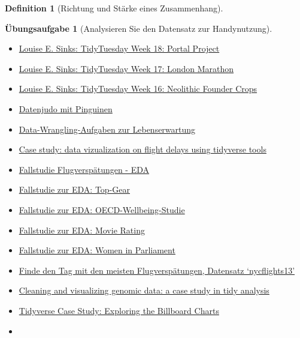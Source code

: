 \documentclass[
  a4paper,
  DIV=11]{scrreprt}
\theoremstyle{definition}
\newtheorem{exercise}{Übungsaufgabe}[chapter]
\theoremstyle{definition}
\theoremstyle{definition}
\newtheorem{definition}{Definition}[chapter]
\theoremstyle{remark}
\begin{document}
\begin{definition}[Richtung und Stärke eines
Zusammenhang]
\begin{exercise}[Analysieren Sie den Datensatz zur
Handynutzung]
\begin{itemize}
\item
  \href{https://lsinks.github.io/posts/2023-05-02-portal-project/portal.html}{Louise
  E. Sinks: TidyTuesday Week 18: Portal Project}
\item
  \href{https://lsinks.github.io/posts/2023-04-25-tidytuesday-marathon/marathon.html}{Louise
  E. Sinks: TidyTuesday Week 17: London Marathon}
\item
  \href{https://lsinks.github.io/posts/2023-04-18-tidytuesday-founder-crops/founder-crops.html}{Louise
  E. Sinks: TidyTuesday Week 16: Neolithic Founder Crops}
\item
  \href{https://allisonhorst.shinyapps.io/dplyr-learnr/\#section-welcome}{Datenjudo
  mit Pinguinen}
\item
  \href{https://data-se.netlify.app/2021/02/24/exercises-to-data-wrangling-with-the-tidyverse/}{Data-Wrangling-Aufgaben
  zur Lebenserwartung}
\item
  \href{https://data-se.netlify.app/2021/02/24/case-study-data-vizualization-on-flight-delays-using-tidyverse-tools/}{Case
  study: data vizualization on flight delays using tidyverse tools}
\item
  \href{https://data-se.netlify.app/2021/03/08/eda-zu-flugversp\%C3\%A4tungen/}{Fallstudie
  Flugverspätungen - EDA}
\item
  \href{https://data-se.netlify.app/2021/02/11/yacda-topgear/}{Fallstudie
  zur EDA: Top-Gear}
\item
  \href{https://data-se.netlify.app/2021/02/11/explorative-datenanalyse-zum-datensatz-oecd-wellbeing/}{Fallstudie
  zur EDA: OECD-Wellbeing-Studie}
\item
  \href{https://minimaxir.com/2018/07/imdb-data-analysis/}{Fallstudie
  zur EDA: Movie Rating}
\item
  \href{https://github.com/saghirb/WiP-tidyverse/blob/master/doc/WiP-tidyverse.pdf}{Fallstudie
  zur EDA: Women in Parliament}
\item
  \href{https://data-se.netlify.app/2021/05/27/datensatz-flights-finde-den-tag-mit-den-meisten-abfl\%C3\%BCgen/}{Finde
  den Tag mit den meisten Flugverspätungen, Datensatz `nycflights13'}
\item
  \href{http://varianceexplained.org/r/tidy-genomics/}{Cleaning and
  visualizing genomic data: a case study in tidy analysis}
\item
  \href{https://www.njtierney.com/post/2017/11/07/tidyverse-billboard/}{Tidyverse
  Case Study: Exploring the Billboard Charts}
\item

\end{itemize}
\end{exercise}
\end{definition}
\end{document}
